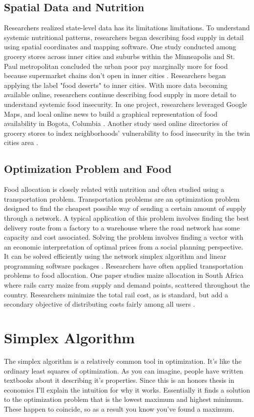 \documentclass{report}
\begin{document}
\subsection{Spatial Data and Nutrition}
Researchers realized state-level data has its limitations limitations. To understand systemic nutritional patterns, researchers began describing food supply in detail using spatial coordinates and mapping software.  One study conducted among grocery stores across inner cities and suburbs within the Minneapolis and St. Paul metropolitan concluded the urban poor pay marginally more for food because supermarket chains don't open in inner cities \cite{Chung}. Researchers began applying the label "food deserts" to inner cities. With more data becoming available online, researchers continue describing food supply in more detail to understand systemic food insecurity. In one project, researchers leveraged Google Maps, and local online news to build a graphical representation of food availability in Bogota, Columbia \cite{Hwang}. Another study used online directories of grocery stores to index neighborhoods' vulnerability to food insecurity in the twin cities area \cite{Larson}.
 
\subsection{Optimization Problem and Food}
Food allocation is closely related with nutrition and often studied using a transportation problem. Transportation problems are an optimization problem designed to find the cheapest possible way of sending a certain amount of supply through a network. A typical application of this problem involves finding the best delivery route from a factory to a warehouse where the road network has some capacity and cost associated. Solving the problem involves finding a vector with an economic interpretation of optimal prices from a social planning perspective. It can be solved efficiently using the network simplex algorithm and linear programming software packages \cite{Cook}. Researchers have often applied transportation problems to food allocation. One paper studies maize allocation in South Africa where rails carry maize from supply and demand points, scattered throughout the country. Researchers minimize the total rail cost, as is standard, but add a secondary objective of distributing costs fairly among all users \cite{Stewart}.

\section{Simplex Algorithm}
The simplex algorithm is a relatively common tool in optimization. It's like the ordinary least squares of optimization. As you can imagine, people have written textbooks about it describing it's properties. Since this is an honors thesis in economics I'll explain the intuition for why it works. Essentially it finds a solution to the optimization problem that is the lowest maximum and highest minimum. These happen to coincide, so as a result you know you've found a maximum.
\end{document}
